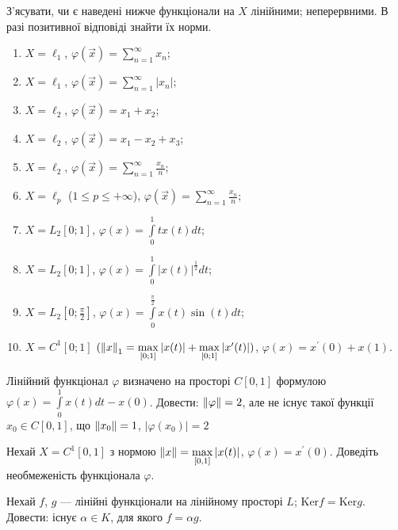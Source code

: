 \begin{exercise}\label{N:1_1_5}
    З'ясувати, чи є наведені нижче функціонали на $X$ лінійними; 
    неперервними. В разі позитивної відповіді знайти їх норми.
    \begin{enumerate}[label=\ukr*)]
        \item $X = \ell_1$, $\varphi(\vec{x}) = \sum\limits_{n=1}^{\infty} x_n $;
        \item $X = \ell_1$, $\varphi(\vec{x}) = \sum\limits_{n=1}^{\infty} |x_n| $;
        \item $X = \ell_2$, $\varphi(\vec{x}) = x_1 + x_2 $;
        \item $X = \ell_2$, $\varphi(\vec{x}) = x_1 - x_2 + x_3$;
        \item $X = \ell_2$, $\varphi(\vec{x}) = \sum\limits_{n=1}^{\infty} \frac{x_n}{n}$;
        \item $X = \ell_p$ ($1 \leq p \leq +\infty$), $\varphi(\vec{x}) = 
        \sum\limits_{n=1}^{\infty} \frac{x_n}{n}$;
        \item $X = L_2[0;1]$, $\varphi(x) = \int\limits_0^1 tx(t)dt$;
        \item $X = L_2[0;1]$, $\varphi(x) = \int\limits_0^1 |x(t)|^{\frac{1}{2}}dt$;
        \item $X = L_2[0;\frac{\pi}{2}]$,
        $\varphi(x) = \int\limits_0^{\frac{\pi}{2}} x(t)\sin(t)dt$;
        \item $X = C^1[0;1]$ $(\left\lVert x\right\rVert_1 = \max\limits_{[0;1]}|x(t)| + 
        \max\limits_{[0;1]}|x^{\prime}(t)|)$, $\varphi(x) = x^{\prime}(0) + x(1)$.
    \end{enumerate}
\end{exercise}

\begin{exercise}\label{N:1_1_6}
    Лінійний функціонал $\varphi$ визначено на просторі $C[0, 1]$ формулою 
    $\varphi(x) = \int\limits_0^1 x(t)dt - x(0)$. Довести: $\left\lVert\varphi\right\rVert = 2$, 
    але не існує такої функції $x_0 \in C[0, 1]$, що $\left\lVert x_0\right\rVert = 1$, $|\varphi(x_0)| = 2$
\end{exercise}

\begin{exercise}
    Нехай $X = C^1[0, 1]$ з нормою $\left\lVert x\right\rVert = \max\limits_{[0, 1]}|x(t)|$, 
    $\varphi(x) = x^\prime(0)$. Доведіть необмеженість функціонала $\varphi$.
\end{exercise}

\begin{exercise}
    Нехай $f$, $g$ --- лінійні функціонали на лінійному просторі $L$; $\mathrm{Ker} f = \mathrm{Ker} g$. 
    Довести: існує $\alpha \in K$, для якого $f = \alpha g$.
\end{exercise}

